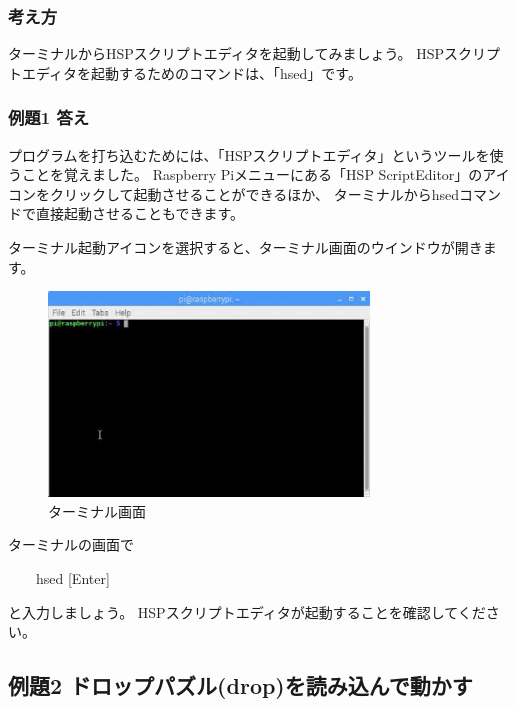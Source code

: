\subsubsection*{考え方}

ターミナルからHSPスクリプトエディタを起動してみましょう。
HSPスクリプトエディタを起動するためのコマンドは、「hsed」です。

\subsubsection*{例題1 答え}

プログラムを打ち込むためには、「HSPスクリプトエディタ」というツールを使うことを覚えました。
Raspberry Piメニューにある「HSP ScriptEditor」のアイコンをクリックして起動させることができるほか、
ターミナルからhsedコマンドで直接起動させることもできます。

ターミナル起動アイコンを選択すると、ターミナル画面のウインドウが開きます。

\begin{figure}[H]
  \begin{center}
    \includegraphics[keepaspectratio,width=8.52cm,height=5.45cm]{images/chap02/text02-img004.png}
    \caption{ターミナル画面}
  \end{center}
  \label{fig:terminal}
\end{figure}

ターミナルの画面で

\vspace{1em}
\ \ \ \ hsed [Enter]
\vspace{1em}

\noindent
と入力しましょう。
HSPスクリプトエディタが起動することを確認してください。
\clearpage

% 
% 
% 
\subsection{例題2 ドロップパズル(drop)を読み込んで動かす}

